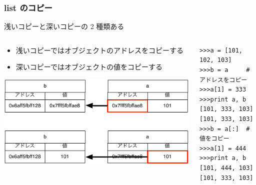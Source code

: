\begin{frame}[t,fragile]
\frametitle{list のコピー}
浅いコピーと深いコピーの 2 種類ある
\begin{columns}
\begin{column}{5cm}
\begin{itemize}
\item 浅いコピーではオブジェクトのアドレスをコピーする
\item 深いコピーではオブジェクトの値をコピーする
\end{itemize}
\includegraphics[width = \textwidth]{copy.pdf}
\end{column}

\begin{column}{7cm}
\begin{lstlisting}
>>>a = [101, 102, 103]                 
>>>b = a     # アドレスをコピー
>>>a[1] = 333
>>>print a, b 
[101, 333, 103] [101, 333, 103]
>>>b = a[:]  # 値をコピー
>>>a[1] = 444
>>>print a, b
[101, 444, 103] [101, 333, 103]
\end{lstlisting}
\end{column}
\end{columns}

\end{frame}

